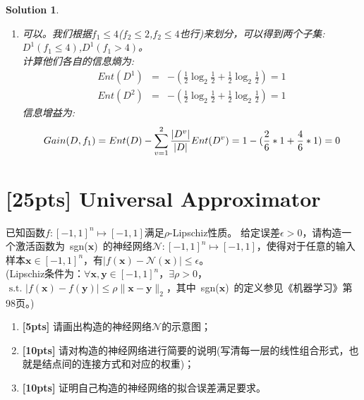 \documentclass[a4paper,UTF8]{article}
\numberwithin{equation}{section}
\newtheorem*{solution}{Solution}
\begin{document}
\begin{solution}
\begin{enumerate}[ {(}1{)}]
 		\item 可以。我们根据$f_1 \leq 4$($f_2 \leq 2$,$f_2 \leq 4$也行)来划分，可以得到两个子集:\\
 		$D^1(f_1 \leq 4)$,$D^1(f_1 > 4)$。\\
 		计算他们各自的信息熵为:\\
 		\begin{equation*}
 		\begin{aligned}
		Ent(D^1)&=&-(\frac{1}{2}\log_2{\frac{1}{2}}+\frac{1}{2}\log_2{\frac{1}{2}})=1\\	Ent(D^2)&=&-(\frac{1}{2}\log_2{\frac{1}{2}}+\frac{1}{2}\log_2{\frac{1}{2}})=1
 		\end{aligned}			
 		\end{equation*}
 		信息增益为:
 		$$Gain(D,f_1) = Ent(D)-\sum_{v=1}^2{\frac{|D^v|}{|D|}Ent(D^v)}\\
 		=1-(\frac{2}{6}*1+\frac{4}{6}*1)=0$$
 	\end{enumerate}
 \end{solution}
\newpage

 \section{[25pts] Universal Approximator}
 已知函数$f:[-1, 1]^n \mapsto [-1, 1]$满足$\rho$-Lipschiz性质。 给定误差$\epsilon > 0$，请构造一个激活函数为\mbox{ sgn($\mathbf{x}$) }的神经网络$ \mathcal{N}:[-1,1]^n \mapsto [-1,1] $，使得对于任意的输入样本$ \mathbf{x} \in [-1,1]^n $，有$|f(\mathbf{x}) - \mathcal{N}(\mathbf{x})| \leq \epsilon$。\\
 (Lipschiz条件为：$ \forall \mathbf{x}, \mathbf{y} \in [-1,1]^n$，$ \exists \rho > 0$，$ \mbox{ s.t. } |f(\mathbf{x})-f(\mathbf{y})| \leq \rho \lVert \mathbf{x} - \mathbf{y} \rVert_2 $，其中\mbox{ sgn($\mathbf{x}$) }的定义参见《机器学习》第98页。)
 
  \begin{enumerate}[ {(}1{)}]
 	\item \textbf{[5pts]} 请画出构造的神经网络$\mathcal{N}$的示意图；
 	
 	\item \textbf{[10pts]} 请对构造的神经网络进行简要的说明(写清每一层的线性组合形式，也就是结点间的连接方式和对应的权重)；
 	
 	\item \textbf{[10pts]} 证明自己构造的神经网络的拟合误差满足要求。
 \end{enumerate}
\end{document}
